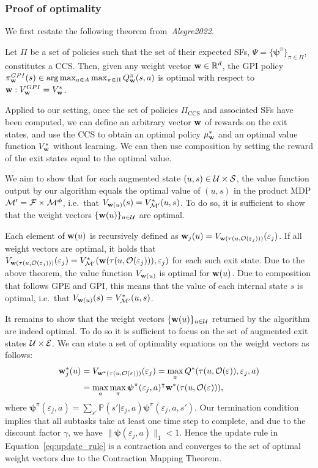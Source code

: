 \subsubsection{Proof of optimality} We first restate the following theorem from~\textit{Alegre2022}.

\begin{theorem}
Let $\Pi$ be a set of policies such that the set of their expected SFs, $\Psi=\{\boldsymbol{\psi}^\pi\}_{\pi\in\Pi}$, constitutes a CCS. Then, given any weight vector $\mathbf{w}\in\mathbb{R}^d$, the GPI policy $\pi_{\mathbf{w}}^{GPI}(s) \in \arg \max_{a\in A} \max_{\pi\in\Pi} Q_{\mathbf{w}}^\pi(s,a)$ is
optimal with respect to ${\mathbf{w}: V_{\mathbf{w}}^{GPI} = V_{\mathbf{w}}^*}$.
\end{theorem}

\noindent
Applied to our setting, once the set of policies $\Pi_\text{CCS}$ and associated SFs have been computed, we can define an arbitrary vector $\mathbf{w}$ of rewards on the exit states, and use the CCS to obtain an optimal policy $\mu_{\mathbf{w}}^*$ and an optimal value function $V_{\mathbf{w}}^*$ without learning. We can then use composition by setting the reward of the exit states equal to the optimal value.

We aim to show that for each augmented state ${(u,s)\in\mathcal{U}\times\mathcal{S}}$, the value function output by our algorithm equals the optimal value of $(u,s)$ in the product MDP $\mathcal{M}'=\mathcal{F}\times\mathcal{M}^{\boldsymbol{\phi}}$, i.e.~that $V_{\mathbf{w}(u)}(s)=V_{\mathcal{M}'}^*(u,s)$. To do so, it is sufficient to show that the weight vectors $\{\mathbf{w}(u)\}_{u\in\mathcal{U}}$ are optimal.

 Each element of $\mathbf{w}(u)$ is recursively defined as $\mathbf{w}_j(u)=V_{\mathbf{w}(\tau(u,\mathcal{O}(\varepsilon_j)))}(\varepsilon_j)$. If all weight vectors are optimal, it holds that $V_{\mathbf{w}(\tau(u,\mathcal{O}(\varepsilon_j)))}(\varepsilon_j)=V_{\mathcal{M}'}^*(\mathbf{w}(\tau(u,\mathcal{O}(\varepsilon_j))),\varepsilon_j)$ for each such exit state. Due to the above theorem, the value function $V_{\mathbf{w}(u)}$ is optimal for $\mathbf{w}(u)$. Due to composition that follows GPE and GPI, this means that the value of each internal state $s$ is optimal, i.e.~that $V_{\mathbf{w}(u)}(s)=V_{\mathcal{M}'}^*(u,s)$.

It remains to show that the weight vectors $\{\mathbf{w}(u)\}_{u\in\mathcal{U}}$ returned by the algorithm are indeed optimal. To do so it is sufficient to focus on the set of augmented exit states $\mathcal{U}\times\mathcal{E}$. We can state a set of optimality equations on the weight vectors as follows:
\begin{align*}
\mathbf{w}_j^*(u) &= V_{\mathbf{w}^*(\tau(u,\mathcal{O}(\varepsilon)))}(\varepsilon_j)= \max_a Q^*(\tau(u,\mathcal{O}(\varepsilon)),\varepsilon_j,a)\\
 &= \max_a\max_\pi {\boldsymbol{\psi}}^\pi(\varepsilon_j,a)^\intercal \mathbf{w}^*(\tau(u,\mathcal{O}(\varepsilon))),
\end{align*}
where ${\boldsymbol{\psi}}^\pi(\varepsilon_j,a)=\sum_{s'}\mathbb{P}(s'|\varepsilon_j,a)\boldsymbol{\psi}^\pi(\varepsilon_j,a,s')$. Our termination condition implies that all subtasks take at least one time step to complete, and due to the discount factor $\gamma$, we have $\lVert\boldsymbol{\psi}(\varepsilon_j,a)\rVert_1<1$. Hence the update rule in Equation~\eqref{eq:update_rule} is a contraction and converges to the set of optimal weight vectors due to the Contraction Mapping Theorem.

